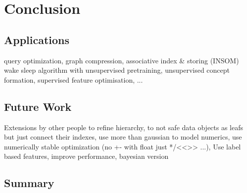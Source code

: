 \chapter{Conclusion}
\section{Applications}
query optimization, graph compression, associative index \& storing (INSOM) wake sleep algorithm with unsupervised pretraining, unsupervised concept formation, supervised feature optimisation, ...
\section{Future Work}
Extensions by other people to refine hierarchy, to not safe data objects as leafs but just connect their indexes, use more than gaussian to model numerics, use numerically stable optimization (no +- with float just */<<>> ...), Use label based features, improve performance, bayesian version

\section{Summary}

